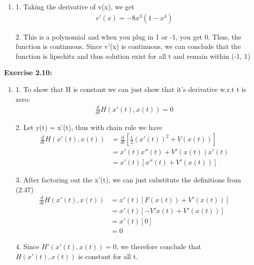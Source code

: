\documentclass[12pt]{article}
\begin{document}
\begin{enumerate}
        \vspace{20pt}

  \item [(b)]

        1. Taking the derivative of v(x), we get
        \begin{align*}
          v'(x) = -8x^3(1-x^4)
        \end{align*}

        2. This is a polynomial and when you plug in 1 or -1, you get 0. Thus, the function is continuous. Since v'(x) is continuous, we can conclude that the function is lipschitz and thus solution exist for all t and remain within (-1, 1)
\end{enumerate}

\noindent \textbf{Exercise 2.10:}

\begin{enumerate}
  \item [(a)]

        1. To show that H is constant we can just show that it's derivative w.r.t t is zero:
        \begin{align*}
          \frac{d}{dt} H(x'(t), x(t)) = 0
        \end{align*}

        2. Let y(t) = x'(t), thus with chain rule we have
        \begin{align*}
          \frac{d}{dt} H(x'(t), x(t)) & = \frac{d}{dt} [\frac{1}{2}(x'(t))^2 + V(x(t))] \\
                                      & = x'(t)x''(t) + V'(x(t))x'(t)                   \\
                                      & = x'(t) [x''(t) + V'(x(t))]
        \end{align*}

        3. After factoring out the x'(t), we can just substitute the definitions from (2.47)
        \begin{align*}
          \frac{d}{dt} H(x'(t), x(t)) & = x'(t) [F(x(t)) + V'(x(t))] \\
                                      & = x'(t) [-V'x(t) + V'(x(t))] \\
                                      & = x'(t) [0]                  \\
                                      & = 0
        \end{align*}

        4. Since $H'(x'(t), x(t)) = 0$, we therefore conclude that $H(x'(t),x(t))$ is constant for all t.


\end{enumerate}
\end{document}
